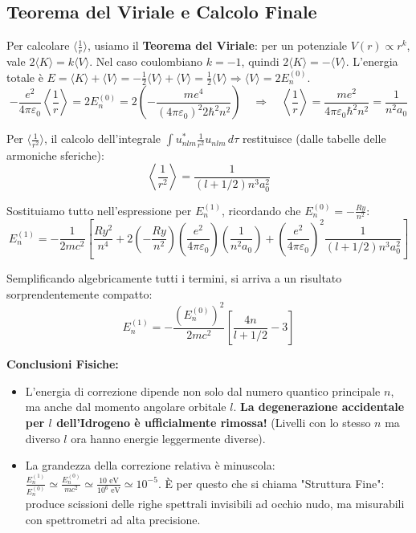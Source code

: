 \documentclass[11pt, a4paper]{article}
\begin{document}
\subsection{Teorema del Viriale e Calcolo Finale} %

Per calcolare $\langle \frac{1}{r} \rangle$, usiamo il \textbf{Teorema del Viriale}: per un potenziale $V(r) \propto r^k$, vale $2\langle K \rangle = k\langle V \rangle$. %
Nel caso coulombiano $k = -1$, quindi $2\langle K \rangle = -\langle V \rangle$. %
L'energia totale è $E = \langle K \rangle + \langle V \rangle = -\frac{1}{2}\langle V \rangle + \langle V \rangle = \frac{1}{2}\langle V \rangle \Rightarrow \langle V \rangle = 2E_n^{(0)}$. %
\begin{equation*}
    -\frac{e^2}{4\pi\varepsilon_0} \left\langle \frac{1}{r} \right\rangle = 2E_n^{(0)} = 2 \left( -\frac{me^4}{(4\pi\varepsilon_0)^2 2\hbar^2 n^2} \right) \quad \Rightarrow \quad \left\langle \frac{1}{r} \right\rangle = \frac{me^2}{4\pi\varepsilon_0 \hbar^2 n^2} = \frac{1}{n^2 a_0} %
\end{equation*}

\noindent
Per $\langle \frac{1}{r^2} \rangle$, il calcolo dell'integrale $\int u_{nlm}^* \frac{1}{r^2} u_{nlm} \, d\tau$ restituisce (dalle tabelle delle armoniche sferiche): %
\begin{equation*}
    \left\langle \frac{1}{r^2} \right\rangle = \frac{1}{(l + 1/2) n^3 a_0^2} %
\end{equation*}

Sostituiamo tutto nell'espressione per $E_n^{(1)}$, ricordando che $E_n^{(0)} = -\frac{Ry}{n^2}$: %
\begin{equation*}
    E_n^{(1)} = -\frac{1}{2mc^2} \left[ \frac{Ry^2}{n^4} + 2 \left(-\frac{Ry}{n^2}\right) \left(\frac{e^2}{4\pi\varepsilon_0}\right) \left(\frac{1}{n^2 a_0}\right) + \left(\frac{e^2}{4\pi\varepsilon_0}\right)^2 \frac{1}{(l+1/2)n^3 a_0^2} \right] %
\end{equation*}

\noindent
Semplificando algebricamente tutti i termini, si arriva a un risultato sorprendentemente compatto: %
\begin{equation}
    \boxed{ E_n^{(1)} = -\frac{(E_n^{(0)})^2}{2mc^2} \left[ \frac{4n}{l + 1/2} - 3 \right] } %
\end{equation}

\textbf{Conclusioni Fisiche:} %
\begin{itemize}
    \item L'energia di correzione dipende non solo dal numero quantico principale $n$, ma anche dal momento angolare orbitale $l$. \textbf{La degenerazione accidentale per $l$ dell'Idrogeno è ufficialmente rimossa!} (Livelli con lo stesso $n$ ma diverso $l$ ora hanno energie leggermente diverse). %
    \item La grandezza della correzione relativa è minuscola: $\frac{E_n^{(1)}}{E_n^{(0)}} \simeq \frac{E_n^{(0)}}{mc^2} \simeq \frac{10 \text{ eV}}{10^6 \text{ eV}} \simeq 10^{-5}$. È per questo che si chiama "Struttura Fine": produce scissioni delle righe spettrali invisibili ad occhio nudo, ma misurabili con spettrometri ad alta precisione. %
\end{itemize}
\end{document}
